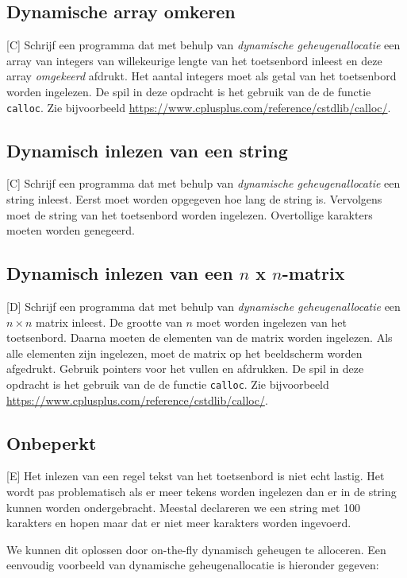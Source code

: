 \documentclass[a4paper,10pt,fleqn,twoside]{article}
\begin{document}
\subsection{Dynamische array omkeren}[C]
Schrijf een programma dat met behulp van \textsl{dynamische geheugenallocatie} een array van integers van willekeurige lengte van het toetsenbord inleest en deze array \textsl{omgekeerd} afdrukt. Het aantal integers moet als getal van het toetsenbord worden ingelezen. De spil in deze opdracht is het gebruik van de de functie \lstinline|calloc|. Zie bijvoorbeeld \url{https://www.cplusplus.com/reference/cstdlib/calloc/}.

\subsection{Dynamisch inlezen van een string}[C]
Schrijf een programma dat met behulp van \textsl{dynamische geheugenallocatie} een string inleest. Eerst moet worden opgegeven hoe lang de string is. Vervolgens moet de string van het toetsenbord worden ingelezen. Overtollige karakters moeten worden genegeerd.

\subsection{Dynamisch inlezen van een $n$ x $n$-matrix}[D]
Schrijf een programma dat met behulp van \textsl{dynamische geheugenallocatie} een $n\times n$ matrix inleest. De grootte van $n$ moet worden ingelezen van het toetsenbord. Daarna moeten de elementen van de matrix worden ingelezen. Als alle elementen zijn ingelezen, moet de matrix op het beeldscherm worden afgedrukt. Gebruik pointers voor het vullen en afdrukken. De spil in deze opdracht is het gebruik van de de functie \lstinline|calloc|. Zie bijvoorbeeld \url{https://www.cplusplus.com/reference/cstdlib/calloc/}.


\subsection{Onbeperkt}[E]
Het inlezen van een regel tekst van het toetsenbord is niet echt lastig. Het wordt pas problematisch als er meer tekens worden ingelezen dan er in de string kunnen worden ondergebracht. Meestal declareren we een string met 100 karakters en hopen maar dat er niet meer karakters worden ingevoerd.

We kunnen dit oplossen door on-the-fly dynamisch geheugen te alloceren. Een eenvoudig voorbeeld van dynamische geheugenallocatie is hieronder gegeven:
\end{document}
